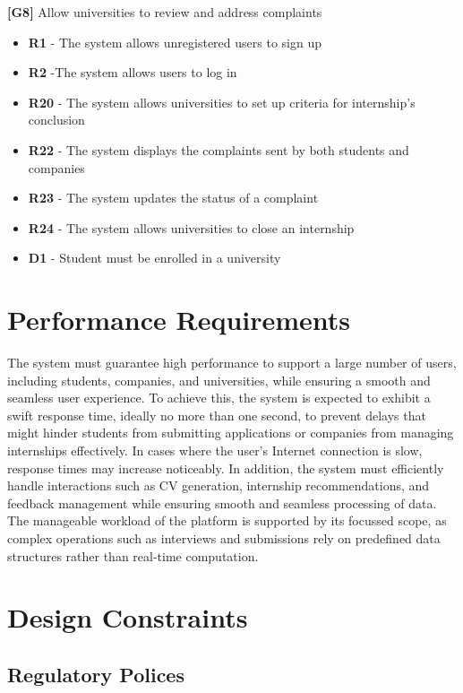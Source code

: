 \textbf{[G8]} Allow universities to review and address complaints
\begin{itemize}
    \item \textbf{R1} - The system allows unregistered users to sign up
    \item \textbf{R2} -The system allows users to log in
    \item \textbf{R20} - The system allows universities to set up criteria for internship's conclusion
    \item \textbf{R22} - The system displays the complaints sent by both students and companies
    \item \textbf{R23} - The system updates the status of a complaint
    \item \textbf{R24} - The system allows universities to close an internship
    \item \textbf{D1} - Student must be enrolled in a university
\end{itemize}



\section{Performance Requirements}

The system must guarantee high performance to support a large number of users, including students, companies, and universities, while ensuring a smooth and seamless user experience. To achieve this, the system is expected to exhibit a swift response time, ideally no more than one second, to prevent delays that might hinder students from submitting applications or companies from managing internships effectively. In cases where the user’s Internet connection is slow, response times may increase noticeably. In addition, the system must efficiently handle interactions such as CV generation, internship recommendations, and feedback management while ensuring smooth and seamless processing of data. The manageable workload of the platform is supported by its focussed scope, as complex operations such as interviews and submissions rely on predefined data structures rather than real-time computation.

\section{Design Constraints}

\subsection{Regulatory Polices}

